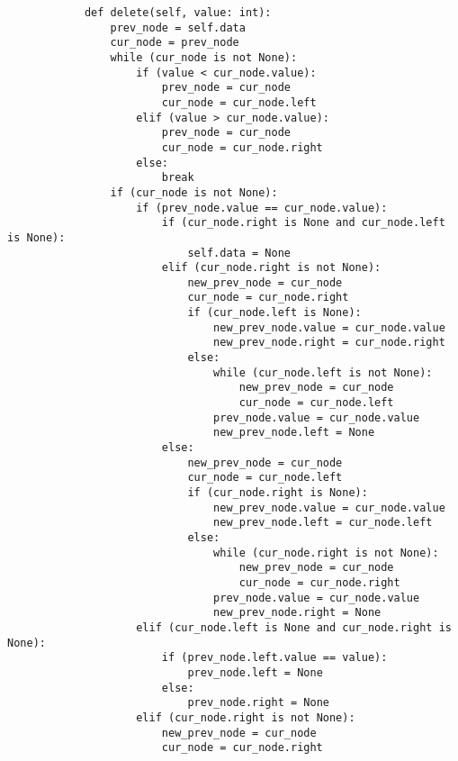 \begin{lstlisting}
            def delete(self, value: int):
                prev_node = self.data
                cur_node = prev_node
                while (cur_node is not None):
                    if (value < cur_node.value):
                        prev_node = cur_node
                        cur_node = cur_node.left
                    elif (value > cur_node.value):
                        prev_node = cur_node
                        cur_node = cur_node.right
                    else:
                        break
                if (cur_node is not None):
                    if (prev_node.value == cur_node.value):
                        if (cur_node.right is None and cur_node.left is None):
                            self.data = None
                        elif (cur_node.right is not None):
                            new_prev_node = cur_node
                            cur_node = cur_node.right
                            if (cur_node.left is None):
                                new_prev_node.value = cur_node.value
                                new_prev_node.right = cur_node.right
                            else:                                        
                                while (cur_node.left is not None):
                                    new_prev_node = cur_node
                                    cur_node = cur_node.left
                                prev_node.value = cur_node.value
                                new_prev_node.left = None
                        else:
                            new_prev_node = cur_node
                            cur_node = cur_node.left
                            if (cur_node.right is None):
                                new_prev_node.value = cur_node.value
                                new_prev_node.left = cur_node.left
                            else:                                        
                                while (cur_node.right is not None):
                                    new_prev_node = cur_node
                                    cur_node = cur_node.right
                                prev_node.value = cur_node.value
                                new_prev_node.right = None
                    elif (cur_node.left is None and cur_node.right is None):
                        if (prev_node.left.value == value):
                            prev_node.left = None
                        else:
                            prev_node.right = None
                    elif (cur_node.right is not None):
                        new_prev_node = cur_node
                        cur_node = cur_node.right

\end{lstlisting}

